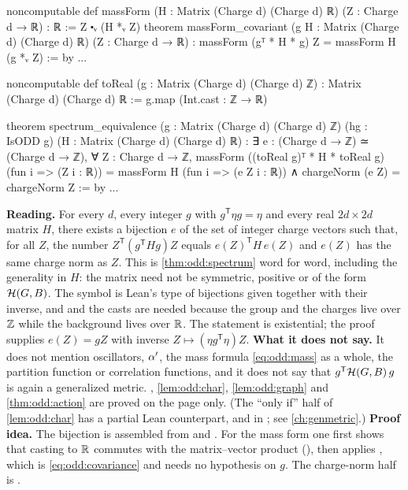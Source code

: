 \begin{leanbox}
\begin{leancode}
noncomputable def massForm (H : Matrix (Charge d) (Charge d) ℝ)
    (Z : Charge d → ℝ) : ℝ := Z ⬝ᵥ (H *ᵥ Z)
theorem massForm_covariant (g H : Matrix (Charge d) (Charge d) ℝ)
    (Z : Charge d → ℝ) :
    massForm (gᵀ * H * g) Z = massForm H (g *ᵥ Z) := by ...

noncomputable def toReal (g : Matrix (Charge d) (Charge d) ℤ) :
    Matrix (Charge d) (Charge d) ℝ := g.map (Int.cast : ℤ → ℝ)

theorem spectrum_equivalence (g : Matrix (Charge d) (Charge d) ℤ)
    (hg : IsODD g) (H : Matrix (Charge d) (Charge d) ℝ) :
    ∃ e : (Charge d → ℤ) ≃ (Charge d → ℤ), ∀ Z : Charge d → ℤ,
      massForm ((toReal g)ᵀ * H * toReal g) (fun i => (Z i : ℝ)) =
        massForm H (fun i => (e Z i : ℝ)) ∧
      chargeNorm (e Z) = chargeNorm Z := by ...
\end{leancode}
\textbf{Reading.} For every $d$, every integer $g$ with $g^{\mathsf T}\eta g=\eta$ and
every real $2d\times2d$ matrix $H$, there exists a bijection $e$ of the set of integer
charge vectors such that, for all $Z$, the number $Z^{\mathsf T}(g^{\mathsf T}Hg)Z$ equals
$e(Z)^{\mathsf T}H\,e(Z)$ and $e(Z)$ has the same charge norm as $Z$. This is
\cref{thm:odd:spectrum} word for word, including the generality in $H$: the matrix need
not be symmetric, positive or of the form $\mathcal{H}(G,B)$. The symbol  is Lean's type of
bijections given together with their inverse, and  and the casts
 are needed because the group and the charges live over $\mathbb{Z}$ while the
background lives over $\mathbb{R}$. The statement is existential; the proof supplies
$e(Z)=gZ$ with inverse $Z\mapsto(\eta g^{\mathsf T}\eta)Z$.
\textbf{What it does not say.} It does not mention oscillators, $\alpha'$, the mass formula
\eqref{eq:odd:mass} as a whole, the partition function or correlation functions, and it
does not say that $g^{\mathsf T}\mathcal{H}(G,B)\,g$ is again a generalized metric.
, \cref{lem:odd:char}, \cref{lem:odd:graph} and \cref{thm:odd:action}
are proved on the page only. (The ``only if'' half of \cref{lem:odd:char} has a partial
Lean counterpart,  and  in
; see \cref{ch:genmetric}.)
\textbf{Proof idea.} The bijection is assembled from  and
. For the mass form one first shows that casting to $\mathbb{R}$ commutes
with the matrix--vector product (), then applies
, which is \eqref{eq:odd:covariance} and needs no hypothesis on
$g$. The charge-norm half is . \TA
\end{leanbox}

